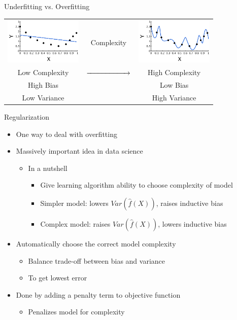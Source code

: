 \documentclass[aspectratio=169]{beamer}
\begin{document}
\begin{frame}[fragile]{Underfitting vs. Overfitting}

\begin{table}
\begin{tabular}{ccc}
\includegraphics[height=6em]{./lectReg/OverUnderDataU1.pdf} & Complexity & \includegraphics[height=6em]{./lectReg/OverUnderDataO1.pdf}\\
Low Complexity & $\xrightarrow{\hspace*{2cm}}$& High Complexity\\
High Bias & & Low Bias \\
Low Variance & & High Variance \\
\end{tabular}
\end{table}
\end{frame}

\begin{frame}{Regularization}

\begin{itemize}
\item One way to deal with overfitting
\item Massively important idea in data science
	\begin{itemize}
	\item In a nutshell
	\begin{itemize}
	\item Give learning algorithm ability to choose complexity of model
	\item Simpler model: lowers $Var(\hat{f}(X))$, raises inductive bias
	\item Complex model: raises $Var(\hat{f}(X))$, lowers inductive bias
	\end{itemize}
	\end{itemize}
\item Automatically choose the correct model complexity
	\begin{itemize}
	\item Balance trade-off between bias and variance
	\item To get lowest error
	\end{itemize}
\item Done by adding a penalty term to objective function
	\begin{itemize}
	\item Penalizes model for complexity
	\end{itemize}
\end{itemize}
\end{frame}
\end{document}
